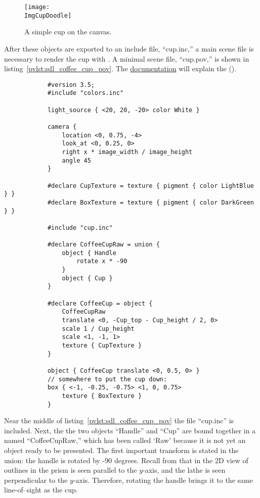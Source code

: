 		\begin{figure}[htbp]
		\centering
		\texttt{[image: \\ImgCupDoodle]}
		\caption{A simple cup on the \dtypkg{} canvas.}
		\label{fig:cup_doodle}
		\end{figure}

		After these objects
		are exported to an include file, ``cup.inc,''
		a main scene file is necessary to render the cup
		with \IXpov{}. A minimal scene file, ``cup.pov,'' is shown in
		listing~\ref{pvlst:sdl_coffee_cup_pov}.
		The \IXpov{}
		\href{http://www.povray.org/documentation/}{documentation}
		will explain the  ().
		
		\begin{povsdl}
			{\small
			\begin{verbatim}
			#version 3.5;
			#include "colors.inc"
			
			light_source { <20, 20, -20> color White }
			
			camera {
			    location <0, 0.75, -4>
			    look_at <0, 0.25, 0>
			    right x * image_width / image_height
			    angle 45
			}
			
			#declare CupTexture = texture { pigment { color LightBlue } }
			#declare BoxTexture = texture { pigment { color DarkGreen } }
			
			#include "cup.inc"
			
			#declare CoffeeCupRaw = union {
			    object { Handle
			        rotate x * -90
			    }
			    object { Cup }
			}
			
			#declare CoffeeCup = object {
			    CoffeeCupRaw
			    translate <0, -Cup_top - Cup_height / 2, 0>
			    scale 1 / Cup_height
			    scale <1, -1, 1>
			    texture { CupTexture }
			}
			
			object { CoffeeCup translate <0, 0.5, 0> }
			// somewhere to put the cup down:
			box { <-1, -0.25, -0.75> <1, 0, 0.75>
			    texture { BoxTexture }
			}
			\end{verbatim}
			}%
		\caption{\dtypov{} SDL for a simple coffee cup scene.}
		\label{pvlst:sdl_coffee_cup_pov}
		\end{povsdl}

		Near the middle of listing~\ref{pvlst:sdl_coffee_cup_pov}
		the file
		``cup.inc'' is included. Next, the the two objects
		``Handle'' and ``Cup'' are bound together in a
		 named ``CoffeeCupRaw,'' which has
		been called `Raw' because it is
		not yet an object ready to be presented.
		The first important transform is stated in the union:
		the handle is rotated by -90 degrees. Recall from
		 that in the
		2D view of outlines in \IXpkg{} the prism is seen
		parallel to the $y$-axis, and the lathe is seen
		perpendicular to the $y$-axis. Therefore, rotating
		the handle brings it to the same line-of--sight as
		the cup.
		
